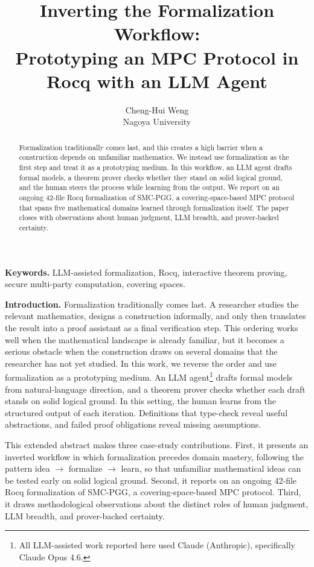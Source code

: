 \documentclass[11pt,a4paper]{article}
\title{Inverting the Formalization Workflow:\\
  Prototyping an MPC Protocol in Rocq with an LLM Agent}
\author{Cheng-Hui Weng\\
Nagoya University}
\date{}
\begin{document}
\maketitle
\vspace{-1em}
\thispagestyle{empty}

\begin{abstract}
Formalization traditionally comes last, and this creates a high barrier when a construction depends on unfamiliar mathematics. We instead use formalization as the first step and treat it as a prototyping medium. In this workflow, an LLM agent drafts formal models, a theorem prover checks whether they stand on solid logical ground, and the human steers the process while learning from the output. We report on an ongoing 42-file Rocq formalization of SMC-PGG, a covering-space-based MPC protocol that spans five mathematical domains learned through formalization itself. The paper closes with observations about human judgment, LLM breadth, and prover-backed certainty.
\end{abstract}

\noindent\textbf{Keywords.} LLM-assisted formalization, Rocq, interactive theorem proving, secure multi-party computation, covering spaces.

\noindent\textbf{Introduction.}
Formalization traditionally comes last. A researcher studies the relevant mathematics, designs a construction informally, and only then translates the result into a proof assistant as a final verification step. This ordering works well when the mathematical landscape is already familiar, but it becomes a serious obstacle when the construction draws on several domains that the researcher has not yet studied. In this work, we reverse the order and use formalization as a prototyping medium. An LLM agent\footnote{All LLM-assisted work reported here used Claude (Anthropic), specifically Claude Opus 4.6.} drafts formal models from natural-language direction, and a theorem prover checks whether each draft stands on solid logical ground. In this setting, the human learns from the structured output of each iteration. Definitions that type-check reveal useful abstractions, and failed proof obligations reveal missing assumptions.

This extended abstract makes three case-study contributions. First, it presents an inverted workflow in which formalization precedes domain mastery, following the pattern idea $\to$ formalize $\to$ learn, so that unfamiliar mathematical ideas can be tested early on solid logical ground. Second, it reports on an ongoing 42-file Rocq formalization of SMC-PGG, a covering-space-based MPC protocol. Third, it draws methodological observations about the distinct roles of human judgment, LLM breadth, and prover-backed certainty.
\end{document}
